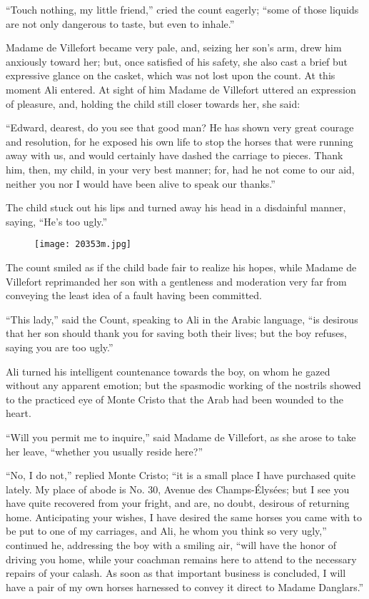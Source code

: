 “Touch nothing, my little friend,” cried the count eagerly; “some of
those liquids are not only dangerous to taste, but even to inhale.”

Madame de Villefort became very pale, and, seizing her son’s arm, drew
him anxiously toward her; but, once satisfied of his safety, she also
cast a brief but expressive glance on the casket, which was not lost
upon the count. At this moment Ali entered. At sight of him Madame de
Villefort uttered an expression of pleasure, and, holding the child
still closer towards her, she said:

“Edward, dearest, do you see that good man? He has shown very great
courage and resolution, for he exposed his own life to stop the horses
that were running away with us, and would certainly have dashed the
carriage to pieces. Thank him, then, my child, in your very best
manner; for, had he not come to our aid, neither you nor I would have
been alive to speak our thanks.”

The child stuck out his lips and turned away his head in a disdainful
manner, saying, “He’s too ugly.”

\begin{figure}[ht]
\texttt{[image: 20353m.jpg]}
\end{figure}

The count smiled as if the child bade fair to realize his hopes, while
Madame de Villefort reprimanded her son with a gentleness and
moderation very far from conveying the least idea of a fault having
been committed.

“This lady,” said the Count, speaking to Ali in the Arabic language,
“is desirous that her son should thank you for saving both their lives;
but the boy refuses, saying you are too ugly.”

Ali turned his intelligent countenance towards the boy, on whom he
gazed without any apparent emotion; but the spasmodic working of the
nostrils showed to the practiced eye of Monte Cristo that the Arab had
been wounded to the heart.

“Will you permit me to inquire,” said Madame de Villefort, as she arose
to take her leave, “whether you usually reside here?”

“No, I do not,” replied Monte Cristo; “it is a small place I have
purchased quite lately. My place of abode is No. 30, Avenue des
Champs-Élysées; but I see you have quite recovered from your fright,
and are, no doubt, desirous of returning home. Anticipating your
wishes, I have desired the same horses you came with to be put to one
of my carriages, and Ali, he whom you think so very ugly,” continued
he, addressing the boy with a smiling air, “will have the honor of
driving you home, while your coachman remains here to attend to the
necessary repairs of your calash. As soon as that important business is
concluded, I will have a pair of my own horses harnessed to convey it
direct to Madame Danglars.”

